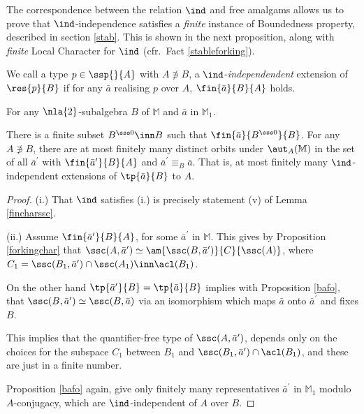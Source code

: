 \medskip
The correspondence between the relation $\ind$ and free amalgams allows us to prove
that $\ind$-independence satisfies a {\em finite} instance of {\small\sc Boundedness} property, described
in section \ref{stab}. This is shown in the next proposition, along with {\em finite} {\small\sc Local Character} for $\ind$ (cfr.{\ }Fact \ref{stableforking}).

\medskip
We call a type $p\in\ssp{}{A}$ with $A\nni B$, a $\ind$-{\em independendent} extension of $\res{p}{B}$ if for any $\bar a$ realising $p$ over $A$,
$\fin{\bar a}{B}{A}$ holds.

\begin{lem}\label{finitelcb}
For any $\nla{2}$-subalgebra $B$ of $\mathbb{M}$ and $\bar a$ in $\mathbb{M}_{1}$.
\begin{itemize}
There is a finite subset $B^{\sss 0}\inn B$
such that $\fin{\bar a}{B^{\sss 0}}{B}$.
For any $A\nni B$, there are at most finitely many distinct orbits under $\aut_{A}(\mathbb{M})$
in the set of all $\bar a^{\prime}$ with $\fin{\bar a^{\prime}}{B}{A}$ and $\bar a^{\prime}\equiv_{B}\bar a$. That is, at most finitely many
$\ind$-independent extensions of $\tp{\bar a}{B}$ to $A$.
\end{itemize}
\end{lem}
\begin{proof}
(i.) That $\ind$ satisfies (i.) is precisely statement (v) of Lemma \ref{fincharssc}.

\smallskip
(ii.) Assume
$\fin{\bar a^{\prime}}{B}{A}$, for some $\bar a^{\prime}$ in $\mathbb{M}$. This gives by Proposition \ref{forkingchar}
that $\ssc(A,\bar a^{\prime})\simeq\am{\ssc(B,\bar a^{\prime})}{C}{\ssc(A)}$,
where $C_{1}=\ssc(B_{1},\bar a^{\prime})\cap\ssc(A_{1})\inn\acl(B_{1})$.

On the other hand  $\tp{\bar a^{\prime}}{B}=
\tp{\bar a}{B}$ implies with Proposition \ref{bafo}, that $\ssc(B,\bar a^{\prime})\simeq\ssc(B,\bar a)$ via an isomorphism which maps
$\bar a$ onto $\bar a^{\prime}$ and fixes $B$.

This implies that the quantifier-free type of $\ssc(A,\bar a^{\prime})$, depends only on the choices for the subspace $C_{1}$
between $B_{1}$ and $\ssc(B_{1},\bar a^{\prime})\cap\acl(B_{1})$, and these are just in a finite number.
 
Proposition \ref{bafo} again, give only finitely many representatives $\bar a^{\prime}$ in $\mathbb{M}_{1}$
modulo $A$-conjugacy, which are $\ind$-independent of $A$ over $B$.
\end{proof}

